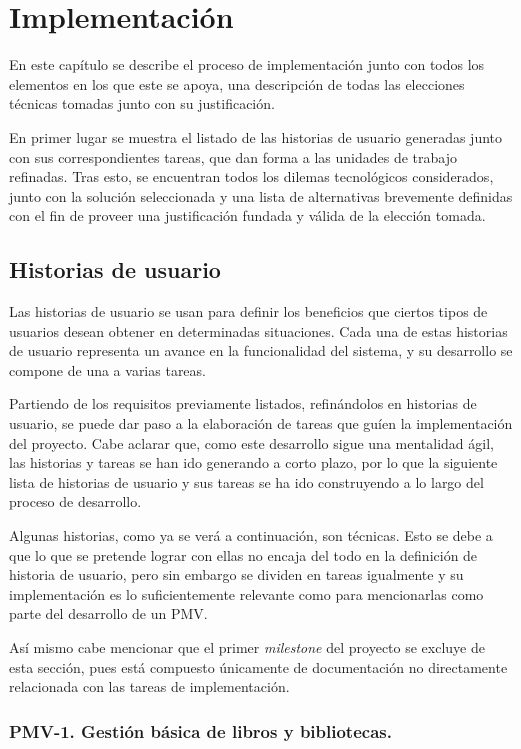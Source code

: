 \chapter{Implementación}

En este capítulo se describe el proceso de implementación junto con todos los elementos en los que este se apoya, una descripción de todas las elecciones técnicas tomadas junto con su justificación.

En primer lugar se muestra el listado de las historias de usuario generadas junto con sus correspondientes tareas, que dan forma a las unidades de trabajo refinadas. Tras esto, se encuentran todos los dilemas tecnológicos considerados, junto con la solución seleccionada y  una lista de alternativas brevemente definidas con el fin de proveer una justificación fundada y válida de la elección tomada.

\section{Historias de usuario}

Las historias de usuario se usan para definir los beneficios que ciertos tipos de usuarios desean obtener en determinadas situaciones. Cada una de estas historias de usuario representa un avance en la funcionalidad del sistema, y su desarrollo se compone de una a varias tareas.

Partiendo de los requisitos previamente listados, refinándolos en historias de usuario, se puede dar paso a la elaboración de tareas que guíen la implementación del proyecto. Cabe aclarar que, como este desarrollo sigue una mentalidad ágil, las historias y tareas se han ido generando a corto plazo, por lo que la siguiente lista de historias de usuario y sus tareas se ha ido construyendo a lo largo del proceso de desarrollo.

Algunas historias, como ya se verá a continuación, son técnicas. Esto se debe a que lo que se pretende lograr con ellas no encaja del todo en la definición de historia de usuario, pero sin embargo se dividen en tareas igualmente y su implementación es lo suficientemente relevante como para mencionarlas como parte del desarrollo de un PMV.

Así mismo cabe mencionar que el primer \textit{milestone} del proyecto se excluye de esta sección, pues está compuesto únicamente de documentación no directamente relacionada con las tareas de implementación.

\subsection{PMV-1. Gestión básica de libros y bibliotecas.}

